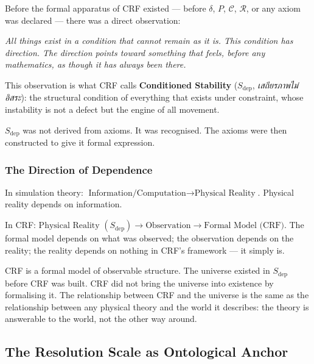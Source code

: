 \documentclass[12pt, a4paper]{article}
\begin{document}
\begin{formalbox}[title={DEF-RN01: The Pre-Formal Observation}]
Before the formal apparatus of CRF existed --- before $\delta$,
$P$, $\mathcal{C}$, $\mathcal{R}$, or any axiom was declared ---
there was a direct observation:

\medskip
\textit{All things exist in a condition that cannot remain as it
is. This condition has direction. The direction points toward
something that feels, before any mathematics, as though it
has always been there.}

\medskip
This observation is what CRF calls \textbf{Conditioned Stability}
($S_{\mathrm{dep}}$, \emph{เสถียรภาพไม่อิสระ}): the structural
condition of everything that exists under constraint, whose
instability is not a defect but the engine of all movement.

$S_{\mathrm{dep}}$ was not derived from axioms. It was recognised.
The axioms were then constructed to give it formal expression.
\end{formalbox}

\subsubsection{The Direction of Dependence}

In simulation theory: $\text{Information/Computation} \to
\text{Physical Reality}$. Physical reality depends on information.

In CRF: $\text{Physical Reality } (S_{\mathrm{dep}}) \to
\text{Observation} \to \text{Formal Model (CRF)}$.
The formal model depends on what was observed; the observation
depends on the reality; the reality depends on nothing in
CRF's framework --- it simply is.

\begin{keybox}[title={CLM-RN01: CRF models reality;
it does not constitute it}]
CRF is a formal model of observable structure. The universe
existed in $S_{\mathrm{dep}}$ before CRF was built. CRF did not
bring the universe into existence by formalising it. The
relationship between CRF and the universe is the same as the
relationship between any physical theory and the world it
describes: the theory is answerable to the world, not the
other way around.
\end{keybox}

\subsection{The Resolution Scale as Ontological Anchor}
\end{document}
